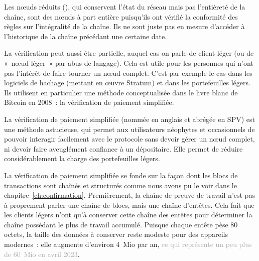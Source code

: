 Les nœuds réduits (), qui conservent l'état du réseau mais pas l'entièreté de la chaîne, sont des nœuds à part entière puisqu'ils ont vérifié la conformité des règles sur l'intégralité de la chaîne. Ils ne sont juste pas en mesure d'accéder à l'historique de la chaîne précédant une certaine date.

La vérification peut aussi être partielle, auquel cas on parle de client léger (ou de «~nœud léger~» par abus de langage). Cela est utile pour les personnes qui n'ont pas l'intérêt de faire tourner un nœud complet. C'est par exemple le cas dans les logiciels de hachage (mettant en œuvre Stratum) et dans les portefeuilles légers. Ils utilisent en particulier une méthode conceptualisée dans le livre blanc de Bitcoin en 2008~: la vérification de paiement simplifiée.

La vérification de paiement simplifiée (nommée en anglais  et abrégée en SPV) est une méthode astucieuse, qui permet aux utilisateurs néophytes et occasionnels de pouvoir interagir facilement avec le protocole sans devoir gérer un nœud complet, ni devoir faire aveuglément confiance à un dépositaire. Elle permet de réduire considérablement la charge des portefeuilles légers.  %

La vérification de paiement simplifiée se fonde sur la façon dont les blocs de transactions sont chaînés et structurés comme nous avons pu le voir dans le chapitre~\ref{ch:confirmation}. Premièrement, la chaîne de preuve de travail n'est pas à proprement parler une chaîne de blocs, mais une chaîne d'entêtes. Cela fait que les clients légers n'ont qu'à conserver cette chaîne des entêtes pour déterminer la chaîne possédant le plus de travail accumulé. Puisque chaque entête pèse 80 octets, la taille des données à conserver reste modeste pour des appareils modernes~: elle augmente d'environ 4~Mio par an, \textcolor{darkgray}{ce qui représente un peu plus de 60~Mio en avril 2023}.

